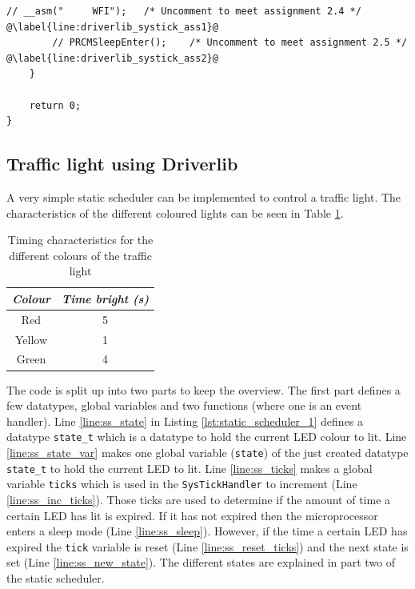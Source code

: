 \begin{lstlisting}[style=CStyle, caption={Toggling LEDs according to Table \ref{tab:led_scheme} using Driverlib}, captionpos=b, label={lst:led_systick_driverlib}, escapechar=@]
        // __asm("     WFI");   /* Uncomment to meet assignment 2.4 */              @\label{line:driverlib_systick_ass1}@
        // PRCMSleepEnter();    /* Uncomment to meet assignment 2.5 */              @\label{line:driverlib_systick_ass2}@
    }

    return 0;
}
\end{lstlisting}

\newpage
\subsection{Traffic light using Driverlib}

A very simple static scheduler can be implemented to control a traffic light.
The characteristics of the different coloured lights can be seen in Table \ref{tab:led_trafficlight}.

\begin{table}[H]
    \centering
    \begin{tabular}{|c|c|}
        \hline
        \textcolor{darkpink}{\textit{Colour}} & \textcolor{darkpink}{\textit{Time bright (s)}}\\
        \hline
        Red & 5 \\
        \hline
        Yellow & 1 \\
        \hline
        Green & 4 \\
        \hline
    \end{tabular}
            
    \caption{Timing characteristics for the different colours of the traffic light}
    \label{tab:led_trafficlight}
\end{table}

The code is split up into two parts to keep the overview.
The first part defines a few datatypes, global variables and two functions (where one is an event handler).
Line \ref{line:ss_state} in Listing \ref{lst:static_scheduler_1} defines a datatype \texttt{state\_t} which is a datatype to hold the current LED colour to lit.
Line \ref{line:ss_state_var} makes one global variable (\texttt{state}) of the just created datatype \texttt{state\_t} to hold the current LED to lit.
Line \ref{line:ss_ticks} makes a global variable \texttt{ticks} which is used in the \texttt{SysTickHandler} to increment (Line \ref{line:ss_inc_ticks}).
Those ticks are used to determine if the amount of time a certain LED has lit is expired.
If it has not expired then the microprocessor enters a sleep mode (Line \ref{line:ss_sleep}).
However, if the time a certain LED has expired the \texttt{tick} variable is reset (Line \ref{line:ss_reset_ticks}) and the next state is set (Line \ref{line:ss_new_state}).
The different states are explained in part two of the static scheduler.

